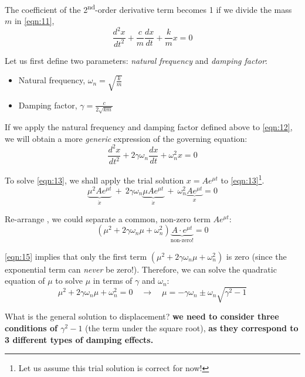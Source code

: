 \documentclass[12pt,a4paper]{article}
\begin{document}
\begin{tcolorbox}[breakable, title=Solution Procedure]
The coefficient of the 2\textsuperscript{nd}-order derivative term becomes 1 if we divide the mass $m$ in \autoref{eqn:11}, 
\begin{equation} \label{eqn:12}
    \frac{d^{2}x}{dt^{2}} + \frac{c}{m} \frac{dx}{dt} + \frac{k}{m}x = 0
\end{equation}

Let us first define two parameters: \textit{natural frequency} and \textit{damping factor}:
\begin{itemize}
    \item Natural frequency, $\displaystyle \omega_{n} = \sqrt{\frac{k}{m}}$
    \item Damping factor, $\displaystyle \gamma = \frac{c}{2\sqrt{km}}$
\end{itemize}

If we apply the natural frequency and damping factor defined above to \autoref{eqn:12}, we will obtain a more \textit{generic} expression of the governing equation: 
\begin{equation} \label{eqn:13}
    \frac{d^{2}x}{dt^{2}} + 2\gamma \omega_{n}\frac{dx}{dt} + \omega_{n}^{2}x=0
\end{equation}

To solve \autoref{eqn:13}, we shall apply the trial solution $\displaystyle x = Ae^{\mu t}$ to \autoref{eqn:13}\footnote{Let us assume this trial solution is correct for now!}.
\begin{equation} \label{eqn:14}
    \underbrace{\mu^{2}Ae^{\mu t}}_{\ddot{x}} \ + \ 2\gamma\omega_{n} \underbrace{\mu Ae^{\mu t}}_{\dot{x}} \ + \ \omega_{n}^{2} \underbrace{Ae^{\mu t}}_{x} = 0
\end{equation}

Re-arrange \label{eqn:14}, we could separate a common, non-zero term $Ae^{\mu t}$: 
\begin{equation} \label{eqn:15}
    (\mu^{2}+2\gamma\omega_{n}\mu+\omega_{n}^{2}) \underbrace{A\cdot e^{\mu t}}_{\text{non-zero!}} = 0
\end{equation}

\autoref{eqn:15} implies that only the first term $\displaystyle (\mu^{2}+2\gamma\omega_{n}\mu+\omega_{n}^{2})$ is zero (since the exponential term can \textit{never} be zero!). Therefore, we can solve the quadratic equation of $\mu$ to solve $\mu$ in terms of $\gamma$ and $\omega_n$:
\begin{equation} \label{eqn:16}
    \mu^{2}+2\gamma\omega_{n}\mu+\omega_{n}^{2} = 0
    \quad \to \quad 
    \boxed{\mu = -\gamma \omega_{n}\pm \omega_{n}\sqrt{\gamma^{2}-1}}
\end{equation}

What is the general solution to displacement? \textbf{we need to consider three conditions of $\gamma^{2}-1$} (the term under the square root), \textbf{as they correspond to 3 different types of damping effects.}
\end{tcolorbox}
\end{document}
